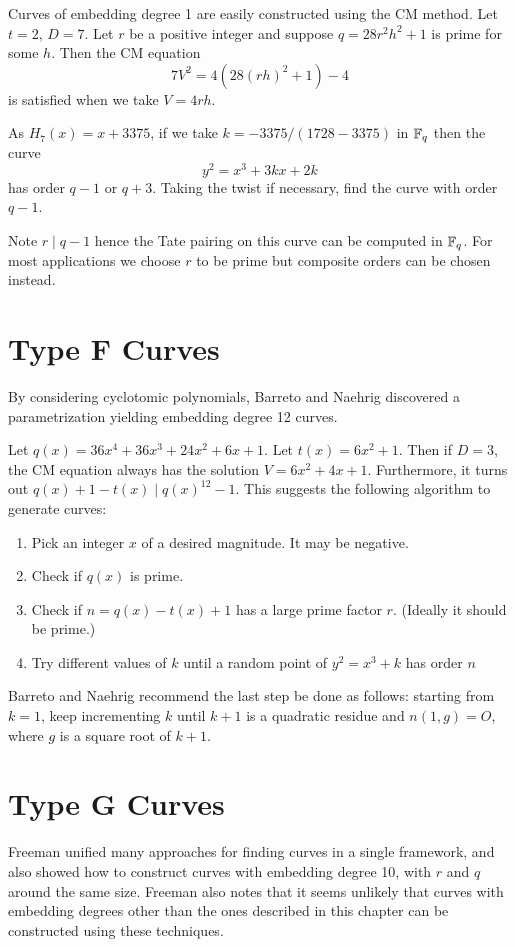 Curves of embedding degree 1 are easily constructed using the CM method.
Let $t = 2$, $D = 7$. Let $r$ be a positive integer
and suppose $q = 28 r^2 h^2 + 1$ is prime for some $h$.
Then the CM equation
\[
7 V^2 = 4 (28 (r h)^2 + 1) - 4
\]
is satisfied when we take $V = 4 r h$.

As $H_7(x) = x + 3375$, if we take $k = -3375 / (1728 - 3375)$ in $\mathbb{F}_q$
then the curve
\[
y^2 = x^3 + 3k x + 2k
\]
has order $q - 1$ or $q + 3$. Taking the twist if necessary,
find the curve with order $q-1$.

Note $r \mid q-1$ hence the Tate pairing on this curve can be computed
in $\mathbb{F}_q$. For most applications we choose $r$ to be prime but composite
orders can be chosen instead.

\section {Type F Curves}

By considering cyclotomic polynomials,
Barreto and Naehrig discovered a parametrization yielding embedding
degree 12 curves.

Let $q(x) = 36x^4 + 36x^3 + 24x^2 + 6x + 1$. Let $t(x) = 6x^2 + 1$.
Then if $D = 3$, the CM equation always has the solution
$V = 6x^2 + 4x + 1$. Furthermore,
it turns out $q(x) + 1 - t(x) \mid q(x)^{12} - 1$.
This suggests the following algorithm to generate curves:

\begin{enumerate}
\item
Pick an integer $x$ of a desired magnitude. It may be negative.
\item
Check if $q(x)$ is prime.
\item
Check if $n = q(x) - t(x) + 1$ has a large prime factor $r$.
(Ideally it should be prime.)
\item
Try different values of $k$ until a random point of
$y^2 = x^3 + k$ has order $n$
\end{enumerate}

Barreto and Naehrig recommend the last step be done as follows:
starting from $k = 1$, keep incrementing $k$ until $k+1$ is a quadratic
residue and $n(1,g) = O$, where $g$ is a square root of $k + 1$.

\section {Type G Curves}

Freeman unified many approaches for finding curves in a single
framework\cite{freeman06}, and also showed how to construct curves with
embedding degree 10, with $r$ and $q$ around the same size.
Freeman also notes that it seems unlikely that curves
with embedding degrees other than the ones described in this chapter
can be constructed using these techniques.


